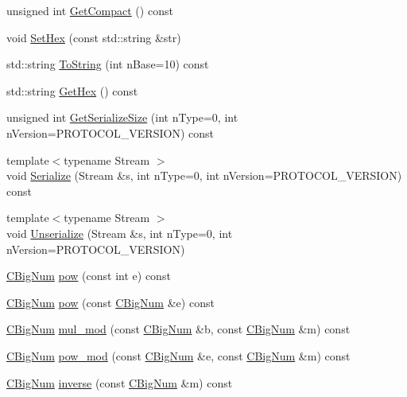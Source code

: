 \begin{DoxyCompactItemize}
\item 
unsigned int \hyperlink{class_c_big_num_a26b88c1b29f347219907979ff2028bdc}{Get\+Compact} () const 
\item 
void \hyperlink{class_c_big_num_a9d4f7c42f141e45410af96e6804c54fe}{Set\+Hex} (const std\+::string \&str)
\item 
std\+::string \hyperlink{class_c_big_num_adca0fa61568497152375328deef6c895}{To\+String} (int n\+Base=10) const 
\item 
std\+::string \hyperlink{class_c_big_num_afdfc11e08c544e06e2877767b3fb8730}{Get\+Hex} () const 
\item 
unsigned int \hyperlink{class_c_big_num_afea3e99a3610f44c90c1242a324fd002}{Get\+Serialize\+Size} (int n\+Type=0, int n\+Version=P\+R\+O\+T\+O\+C\+O\+L\+\_\+\+V\+E\+R\+S\+I\+O\+N) const 
\item 
{\footnotesize template$<$typename Stream $>$ }\\void \hyperlink{class_c_big_num_a710a9e85375ec80a4fbbfaa5341baa1b}{Serialize} (Stream \&s, int n\+Type=0, int n\+Version=P\+R\+O\+T\+O\+C\+O\+L\+\_\+\+V\+E\+R\+S\+I\+O\+N) const 
\item 
{\footnotesize template$<$typename Stream $>$ }\\void \hyperlink{class_c_big_num_aa70f21429cc04c2dbee78189c454bac2}{Unserialize} (Stream \&s, int n\+Type=0, int n\+Version=P\+R\+O\+T\+O\+C\+O\+L\+\_\+\+V\+E\+R\+S\+I\+O\+N)
\item 
\hyperlink{class_c_big_num}{C\+Big\+Num} \hyperlink{class_c_big_num_ab381ce930b1e9e3f04bf5827623c44af}{pow} (const int e) const 
\item 
\hyperlink{class_c_big_num}{C\+Big\+Num} \hyperlink{class_c_big_num_a7da305f67b92265316d02c1cd33f95b7}{pow} (const \hyperlink{class_c_big_num}{C\+Big\+Num} \&e) const 
\item 
\hyperlink{class_c_big_num}{C\+Big\+Num} \hyperlink{class_c_big_num_a17c140842bacbb1e2f03b3677f0075b9}{mul\+\_\+mod} (const \hyperlink{class_c_big_num}{C\+Big\+Num} \&b, const \hyperlink{class_c_big_num}{C\+Big\+Num} \&m) const 
\item 
\hyperlink{class_c_big_num}{C\+Big\+Num} \hyperlink{class_c_big_num_a0f2a7b0ec9115d70a7abd6d77643cfec}{pow\+\_\+mod} (const \hyperlink{class_c_big_num}{C\+Big\+Num} \&e, const \hyperlink{class_c_big_num}{C\+Big\+Num} \&m) const 
\item 
\hyperlink{class_c_big_num}{C\+Big\+Num} \hyperlink{class_c_big_num_a33a8ba28c9e6efe911ed3a8227a81481}{inverse} (const \hyperlink{class_c_big_num}{C\+Big\+Num} \&m) const 

\end{DoxyCompactItemize}
